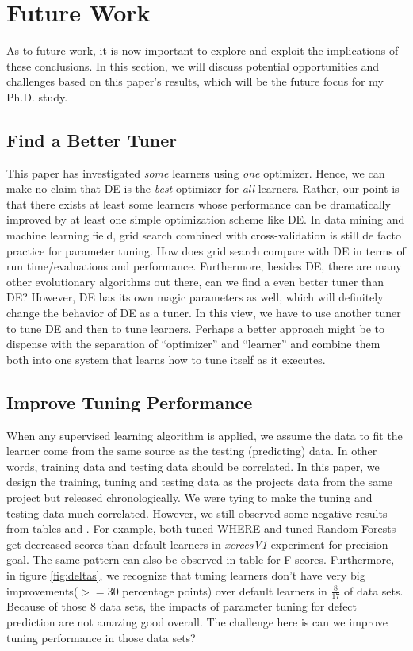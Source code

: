 \section{Future Work}

As to future work, it is now important
to explore and exploit the implications of these
conclusions. In this section, we will discuss potential opportunities and challenges 
based on this paper's results, which will be the future focus for my Ph.D. study.

\subsection{Find a Better Tuner}

This paper has investigated  {\em some} learners using {\em one}  optimizer. Hence, we can make
no claim that DE is the {\em best} optimizer for {\em all} learners.
Rather, our point is that there exists at least some learners
whose performance can be dramatically improved by 
at least one simple optimization scheme like DE. In data mining and machine learning field,
grid search combined with cross-validation is still de facto practice for parameter tuning.
How does grid search compare with DE in terms of run time/evaluations and performance.
Furthermore, besides DE, there are many other evolutionary algorithms out there, can we
find a even better tuner than DE? However, DE has its own magic parameters as well, 
which will definitely change the behavior of DE as a tuner. In this view, we have
to use another tuner to tune DE and then to tune learners. Perhaps a better approach might be
to dispense with the separation of ``optimizer'' and ``learner'' and combine them both
into one system that learns how to tune itself as it executes.

\subsection{Improve Tuning Performance}
When any supervised learning algorithm is applied, we assume the data 
to fit the learner come from the same source as the testing (predicting) data. In other
words, training data and testing data should be correlated. 
In this paper, we
design the training, tuning and testing data as the projects data from the same project but
released chronologically. We were tying to make the tuning and testing data much
correlated. However,  we still observed some negative results from tables  and .
For example, both tuned WHERE and tuned Random Forests get decreased scores than default learners in {\it xercesV1}
experiment for precision goal. The same pattern can also be observed in table  for F scores.
Furthermore, in figure \ref{fig:deltas}, we recognize that tuning learners don't have very big
improvements($>= 30$ percentage points) over default learners in $\frac{8}{17}$ of data sets. Because of those 8 data sets,
the impacts of parameter tuning for defect prediction are not amazing good overall. The challenge here is
can we improve tuning performance in those data sets? 

